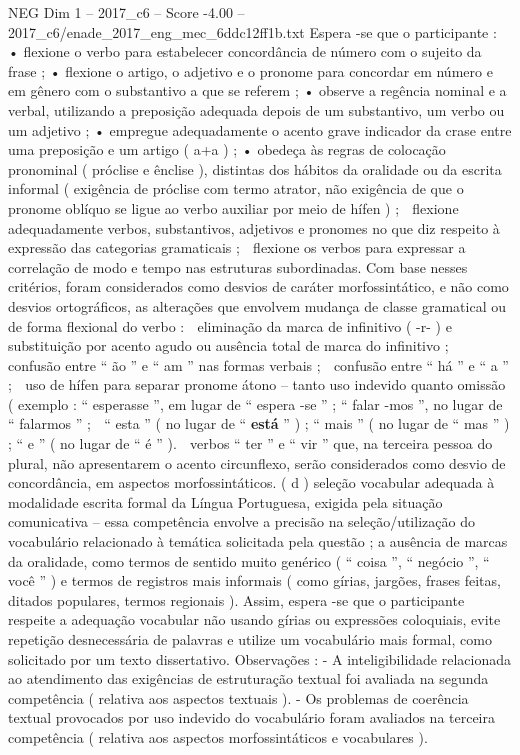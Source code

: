 \begin{textsample}{NEG Dim 1 – 2017\_c6 – Score -4.00 – 2017\_c6/enade\_2017\_eng\_mec\_6ddc12ff1b.txt}
Espera -se que o participante : • flexione o verbo para estabelecer concordância de número com o sujeito da frase ; • flexione o artigo, o adjetivo e o pronome para concordar em número e em gênero com o substantivo a que se referem ; • observe a regência nominal e a verbal, utilizando a preposição adequada depois de um substantivo, um verbo ou um adjetivo ; • empregue adequadamente o acento grave indicador da crase entre uma preposição e um artigo ( a+a ) ; • obedeça às regras de colocação pronominal ( próclise e ênclise ), distintas dos hábitos da oralidade ou da escrita informal ( exigência de próclise com termo atrator, não exigência de que o pronome oblíquo se ligue ao verbo auxiliar por meio de hífen ) ;  flexione adequadamente verbos, substantivos, adjetivos e pronomes no que diz respeito à expressão das categorias gramaticais ;  flexione os verbos para expressar a correlação de modo e tempo nas estruturas subordinadas.
Com base nesses critérios, foram considerados como desvios de caráter morfossintático, e não como desvios ortográficos, as alterações que envolvem mudança de classe gramatical ou de forma flexional do verbo :  eliminação da marca de infinitivo ( -r- ) e substituição por acento agudo ou ausência total de marca do infinitivo ;  confusão entre “ ão ” e “ am ” nas formas verbais ;  confusão entre “ há ” e “ a ” ;  uso de hífen para separar pronome átono – tanto uso indevido quanto omissão ( exemplo : “ esperasse ”, em lugar de “ espera -se ” ; “ falar -mos ”, no lugar de “ falarmos ” ;  “ esta ” ( no lugar de “ \textbf{está} ” ) ; “ mais ” ( no lugar de “ mas ” ) ; “ e ” ( no lugar de “ é ” ).  verbos “ ter ” e “ vir ” que, na terceira pessoa do plural, não apresentarem o acento circunflexo, serão considerados como desvio de concordância, em aspectos morfossintáticos. ( d ) seleção vocabular adequada à modalidade escrita formal da Língua Portuguesa, exigida pela situação comunicativa – essa competência envolve a precisão na seleção/utilização do vocabulário relacionado à temática solicitada pela questão ; a ausência de marcas da oralidade, como termos de sentido muito genérico ( “ coisa ”, “ negócio ”, “ você ” ) e termos de registros mais informais ( como gírias, jargões, frases feitas, ditados populares, termos regionais ).
Assim, espera -se que o participante respeite a adequação vocabular não usando gírias ou expressões coloquiais, evite repetição desnecessária de palavras e utilize um vocabulário mais formal, como solicitado por um texto dissertativo.
Observações : - A inteligibilidade relacionada ao atendimento das exigências de estruturação textual foi avaliada na segunda competência ( relativa aos aspectos textuais ). - Os problemas de coerência textual provocados por uso indevido do vocabulário foram avaliados na terceira competência ( relativa aos aspectos morfossintáticos e vocabulares ).

\end{textsample}
